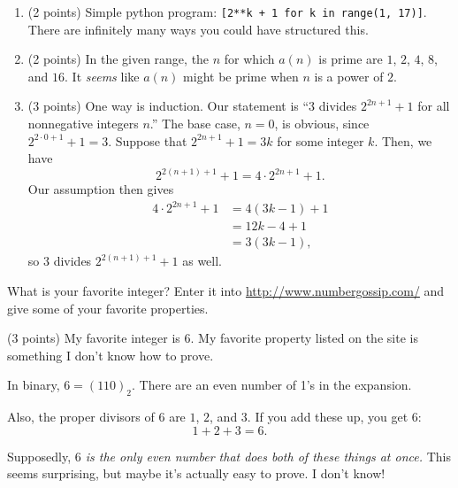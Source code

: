 \documentclass[12pt]{rudin}
\begin{document}
\begin{Answer}
    \begin{enumerate}[label=(\textbf{\alph*})]
        \item (2 points) Simple python program: \texttt{[2**k + 1 for k in
            range(1, 17)]}. There are infinitely many ways you could have
            structured this.

	    \item (2 points) In the given range, the $n$ for which $a(n)$ is prime are $1$,
            $2$, $4$, $8$, and $16$. It \emph{seems} like $a(n)$ might be prime
            when $n$ is a power of $2$.

    \item (3 points) One way is induction. Our statement is ``$3$ divides $2^{2n + 1} + 1$
	    for all nonnegative integers $n$.'' The base case, $n = 0$, is
	    obvious, since $2^{2 \cdot 0 + 1} + 1 = 3$. Suppose that $2^{2n +
	    1} + 1 = 3k$ for some integer $k$. Then, we have $$2^{2(n +
	    1) + 1} + 1 = 4 \cdot 2^{2n + 1} + 1.$$ Our assumption then gives
	    \begin{align*}
		    4 \cdot 2^{2n + 1} + 1 &= 4(3k - 1) + 1 \\
		    		     &= 12k - 4 + 1 \\
				     &= 3(3k - 1),
	    \end{align*}
	    so $3$ divides $2^{2(n + 1) + 1} + 1$ as well.
    \end{enumerate}
\end{Answer}

\begin{Exercise}
    What is your favorite integer? Enter it into
    \url{http://www.numbergossip.com/} and give some of your favorite
    properties.
\end{Exercise}

\begin{Answer}
	(3 points)
	My favorite integer is $6$. My favorite property listed on the site is
	something I don't know how to prove.

	In binary, $6 = (110)_2$. There are an even number of 1's in the
	expansion.

	Also, the proper divisors of 6 are $1$, $2$, and $3$. If you add these
	up, you get $6$: $$1 + 2 + 3 = 6.$$

	Supposedly, \emph{$6$ is the only even number that does both of these
	things at once.} This seems surprising, but maybe it's actually easy to
	prove.  I don't know!
\end{Answer}
\end{document}
